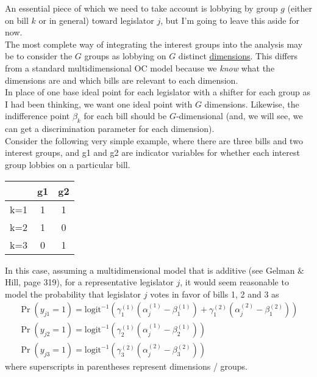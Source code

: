 \documentclass[12pt]{article}
\newcommand{\un}{\underline}
\newcommand{\ga}{\gamma}
\begin{document}
An essential piece of which we need to take account is lobbying by group $g$ (either on bill $k$ or in general) toward legislator $j$, but I'm going to leave this aside for now. \\

The most complete way of integrating the interest groups into the analysis may be to consider the $G$ groups as lobbying on $G$ distinct \un{dimensions}. This differs from a standard multidimensional OC model because we \textit{know} what the dimensions are and which bills are relevant to each dimension. \\

In place of one base ideal point for each legislator with a shifter for each group as I had been thinking, we want one ideal point with $G$ dimensions. Likewise, the indifference point $\beta_k$ for each bill should be $G$-dimensional (and, we will see, we can get a discrimination parameter for each dimension). \\

Consider the following very simple example, where there are three bills and two interest groups, and g1 and g2 are indicator variables for whether each interest group lobbies on a particular bill.
\begin{center}
\begin{tabular}{|  c| c | c |}
 \hline  & g1 & g2 \\ \hline
	k=1& 1 & 1 \\ \hline
	k=2& 1 & 0\\ \hline
	k=3& 0 & 1\\ \hline
\end{tabular}
\end{center}

In this case, assuming a multidimensional model that is additive (see Gelman $\&$ Hill, page 319), for a representative legislator $j$, it would seem reasonable to model the probability that legislator $j$ votes in favor of bills 1, 2 and 3 as
\begin{gather}
  \Pr(y_{j1} = 1) = \text{logit}^{-1}\left( \ga_{1}^{(1)}\left( \alpha_{j}^{(1)} - \beta_{1}^{(1)}\right) + \ga_{1}^{(2)}\left( \alpha_{j}^{(2)} - \beta_{1}^{(2)}\right) \right) \\
  \Pr(y_{j2} = 1) = \text{logit}^{-1}\left( \ga_{2}^{(1)}\left( \alpha_{j}^{(1)} - \beta_{2}^{(1)}\right) \right) \\
	\Pr(y_{j3} = 1) = \text{logit}^{-1}\left( \ga_{3}^{(2)}\left( \alpha_{j}^{(2)} - \beta_{3}^{(2)}\right) \right) 
\end{gather}
where superscripts in parentheses represent dimensions / groups. \\
\end{document}
